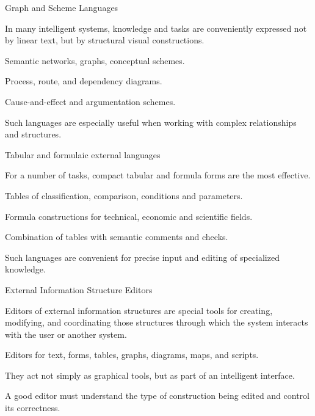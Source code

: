 \begin{frame}{Graph and Scheme Languages}
	\topline
	\justifying
	
	In many intelligent systems, knowledge and tasks are conveniently expressed not by linear text, but by structural visual constructions.
	
	\begin{textitemize}
		\item Semantic networks, graphs, conceptual schemes.
		\item Process, route, and dependency diagrams.
		\item Cause-and-effect and argumentation schemes.
		\item Such languages are especially useful when working with complex relationships and structures.
	\end{textitemize}
\end{frame}

\begin{frame}{Tabular and formulaic external languages}
	\topline
	\justifying
	
	For a number of tasks, compact tabular and formula forms are the most effective.
	
	\begin{textitemize}
		\item Tables of classification, comparison, conditions and parameters.
		\item Formula constructions for technical, economic and scientific fields.
		\item Combination of tables with semantic comments and checks.
		\item Such languages are convenient for precise input and editing of specialized knowledge.
	\end{textitemize}
\end{frame}

\begin{frame}{External Information Structure Editors}
	\topline
	\justifying
	
	Editors of external information structures are special tools for creating, modifying, and coordinating those structures through which the system interacts with the user or another system.
	
	\begin{textitemize}
		\item Editors for text, forms, tables, graphs, diagrams, maps, and scripts.
		\item They act not simply as graphical tools, but as part of an intelligent interface.
		\item A good editor must understand the type of construction being edited and control its correctness.
	\end{textitemize}
\end{frame}

